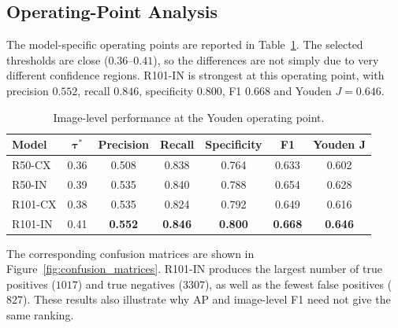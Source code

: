 \documentclass[11pt,a4paper]{article}
\begin{document}
\subsection{Operating-Point Analysis}
\label{subsec:operating_point}

The model-specific operating points are reported in Table~\ref{tab:operating_point_comparison}. The selected thresholds are close ($0.36$--$0.41$), so the differences are not simply due to very different confidence regions. R101-IN is strongest at this operating point, with precision $0.552$, recall $0.846$, specificity $0.800$, F1 $0.668$ and Youden $J=0.646$.

\begin{table}[H]
    \centering
    \caption{Image-level performance at the Youden operating point.}
    \label{tab:operating_point_comparison}
    \begin{tabular}{lcccccc}
        \hline
        \textbf{Model} & $\boldsymbol{\tau^*}$ & \textbf{Precision} & \textbf{Recall} & \textbf{Specificity} & \textbf{F1} & \textbf{Youden J} \\
        \hline
        R50-CX & 0.36 & 0.508 & 0.838 & 0.764 & 0.633 & 0.602 \\
        R50-IN & 0.39 & 0.535 & 0.840 & 0.788 & 0.654 & 0.628 \\
        R101-CX & 0.38 & 0.535 & 0.824 & 0.792 & 0.649 & 0.616 \\
        R101-IN & 0.41 & \textbf{0.552} & \textbf{0.846} & \textbf{0.800} & \textbf{0.668} & \textbf{0.646} \\
        \hline
    \end{tabular}
\end{table}

The corresponding confusion matrices are shown in Figure~\ref{fig:confusion_matrices}. R101-IN produces the largest number of true positives ($1017$) and true negatives ($3307$), as well as the fewest false positives ($827$). These results also illustrate why AP and image-level F1 need not give the same ranking.
\end{document}
